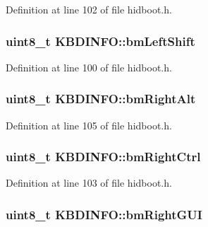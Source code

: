 \-Definition at line 102 of file hidboot.\-h.

\hypertarget{struct_k_b_d_i_n_f_o_a6e26029c5d90e5a31b1a289e40288480}{
\subsubsection[{bm\-Left\-Shift}]{\setlength{\rightskip}{0pt plus 5cm}uint8\-\_\-t {\bf \-K\-B\-D\-I\-N\-F\-O\-::bm\-Left\-Shift}}}\label{struct_k_b_d_i_n_f_o_a6e26029c5d90e5a31b1a289e40288480}


\-Definition at line 100 of file hidboot.\-h.

\hypertarget{struct_k_b_d_i_n_f_o_adcfb3f774c47e6654027ea3d65a0db78}{
\subsubsection[{bm\-Right\-Alt}]{\setlength{\rightskip}{0pt plus 5cm}uint8\-\_\-t {\bf \-K\-B\-D\-I\-N\-F\-O\-::bm\-Right\-Alt}}}\label{struct_k_b_d_i_n_f_o_adcfb3f774c47e6654027ea3d65a0db78}


\-Definition at line 105 of file hidboot.\-h.

\hypertarget{struct_k_b_d_i_n_f_o_ab278c05888bbf6ba5536de6feab90ea8}{
\subsubsection[{bm\-Right\-Ctrl}]{\setlength{\rightskip}{0pt plus 5cm}uint8\-\_\-t {\bf \-K\-B\-D\-I\-N\-F\-O\-::bm\-Right\-Ctrl}}}\label{struct_k_b_d_i_n_f_o_ab278c05888bbf6ba5536de6feab90ea8}


\-Definition at line 103 of file hidboot.\-h.

\hypertarget{struct_k_b_d_i_n_f_o_a516ec184b48c647eced74129f558fbc0}{
\subsubsection[{bm\-Right\-G\-U\-I}]{\setlength{\rightskip}{0pt plus 5cm}uint8\-\_\-t {\bf \-K\-B\-D\-I\-N\-F\-O\-::bm\-Right\-G\-U\-I}}}\label{struct_k_b_d_i_n_f_o_a516ec184b48c647eced74129f558fbc0}


